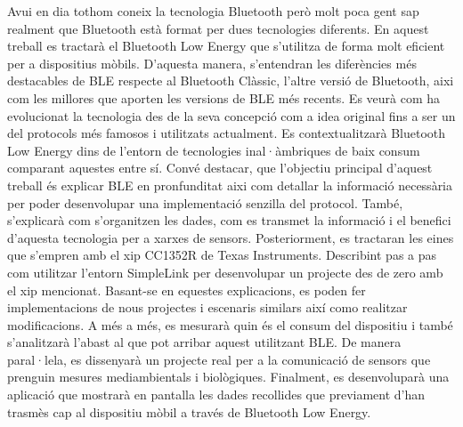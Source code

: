 \documentclass[catalan,final]{setup/eetac_tfc_pfc}
\begin{document}

\beforepreface


\begin{resum}{1cm}
Avui en dia tothom coneix la tecnologia Bluetooth però molt poca gent sap realment que Bluetooth està format per dues tecnologies diferents.
En aquest treball es tractarà el Bluetooth Low Energy que s'utilitza de forma molt eficient per a dispositius mòbils.
\newline
\newline
D'aquesta manera, s'entendran les diferències més destacables de BLE respecte al Bluetooth Clàssic, l'altre versió de Bluetooth, aixi com les millores que aporten les versions de BLE més recents.
Es veurà com ha evolucionat la tecnologia des de la seva concepció com a idea original fins a ser un del protocols més famosos i utilitzats actualment.
Es contextualitzarà Bluetooth Low Energy dins de l'entorn de tecnologies inal·àmbriques de baix consum comparant aquestes entre sí.
\newline
\newline
Convé destacar, que l'objectiu principal d'aquest treball és explicar BLE en pronfunditat aixi com detallar la informació necessària per poder desenvolupar una implementació senzilla del protocol.
També, s'explicarà com s'organitzen les dades, com es transmet la informació i el benefici d'aquesta tecnologia per a xarxes de sensors.
\newline
\newline
Posteriorment, es tractaran les eines que s'empren amb el xip CC1352R de Texas Instruments.
Describint pas a pas com utilitzar l'entorn SimpleLink per desenvolupar un projecte des de zero amb el xip mencionat. Basant-se en equestes explicacions, es poden fer implementacions de nous projectes i escenaris similars així como realitzar modificacions.
\newline
\newline
A més a més, es mesurarà quin és el consum del dispositiu i també s'analitzarà l'abast al que pot arribar aquest utilitzant BLE.
De manera paral·lela, es dissenyarà un projecte real per a la comunicació de sensors que prenguin mesures mediambientals i biològiques.
Finalment, es desenvoluparà una aplicació que mostrarà en pantalla les dades recollides que previament d'han trasmès cap al dispositiu mòbil a través de Bluetooth Low Energy. 
\end{resum}
\end{document}
